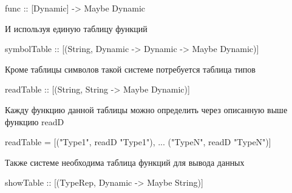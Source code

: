 \begin{code}
  func :: [Dynamic] -> Maybe Dynamic
\end{code}

И используя единую таблицу функций

\begin{code}
  symbolTable :: [(String, Dynamic -> Dynamic -> Maybe Dynamic)]
\end{code}

Кроме таблицы символов такой системе потребуется таблица типов

\begin{code}
  readTable :: [(String, String -> Maybe Dynamic)]
\end{code}

Кажду функцию данной таблицы можно определить через описанную выше
функцию readD

\begin{code}
  readTable = [("Type1", readD "Type1"), ... ("TypeN", readD "TypeN")]
\end{code}

Также системе необходима таблица функций для вывода данных

\begin{code}
  showTable :: [(TypeRep, Dynamic -> Maybe String)]
\end{code}
